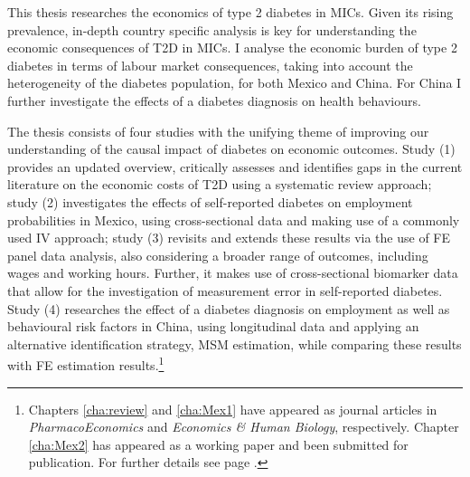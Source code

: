 This thesis researches the economics of type 2 diabetes in \acfp{MIC}. Given its rising prevalence, in-depth country specific analysis is key for understanding the economic consequences of T2D in \acp{MIC}. I analyse the economic burden of type 2 diabetes in terms of labour market consequences, taking into account the heterogeneity of the diabetes population, for both Mexico and China. For China I further investigate the effects of a diabetes diagnosis on health behaviours.

The thesis consists of four studies with the unifying theme of improving our understanding of the causal impact of diabetes on  economic outcomes. Study (1) provides an updated overview, critically assesses and identifies gaps in the current literature on the economic costs of T2D using a systematic review approach; study (2) investigates the effects of self-reported diabetes on employment probabilities in Mexico, using cross-sectional data and making use of a commonly used \acf{IV} approach; study (3) revisits and extends these results via the use of \ac{FE} panel data analysis, also considering a broader range of outcomes, including wages and working hours. Further, it makes use of cross-sectional biomarker data that allow for the investigation of measurement error in self-reported diabetes. Study (4) researches the effect of a diabetes diagnosis on employment as well as behavioural risk factors in China, using longitudinal data and applying an alternative identification strategy, \acf{MSM} estimation, while comparing these results with \ac{FE} estimation results.\footnote{Chapters \ref{cha:review} and \ref{cha:Mex1} have appeared as journal articles in \textit{PharmacoEconomics} and \textit{Economics \& Human Biology}, respectively. Chapter \ref{cha:Mex2} has appeared as a working paper and been submitted for publication. For further details see page \pageref{publication_statement}.}

